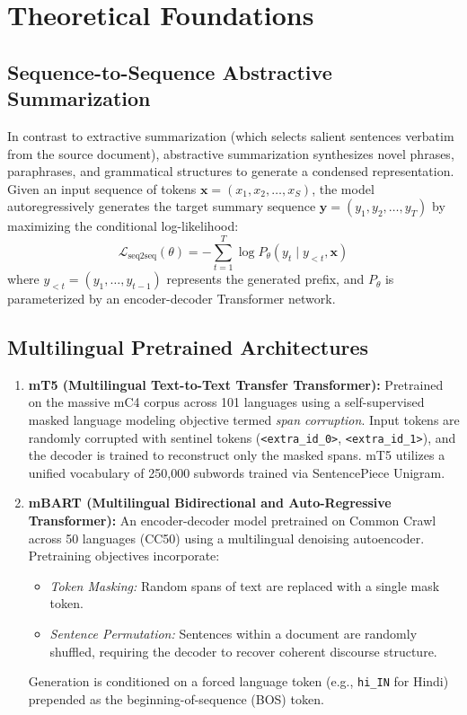 \section{Theoretical Foundations}
\subsection{Sequence-to-Sequence Abstractive Summarization}
In contrast to extractive summarization (which selects salient sentences verbatim from the source document), abstractive summarization synthesizes novel phrases, paraphrases, and grammatical structures to generate a condensed representation. Given an input sequence of tokens $\mathbf{x} = (x_1, x_2, \dots, x_S)$, the model autoregressively generates the target summary sequence $\mathbf{y} = (y_1, y_2, \dots, y_T)$ by maximizing the conditional log-likelihood:
\begin{equation}
    \mathcal{L}_{\text{seq2seq}}(\theta) = -\sum_{t=1}^{T} \log P_\theta(y_t \mid y_{<t}, \mathbf{x})
\end{equation}
where $y_{<t} = (y_1, \dots, y_{t-1})$ represents the generated prefix, and $P_\theta$ is parameterized by an encoder-decoder Transformer network.

\subsection{Multilingual Pretrained Architectures}
\begin{enumerate}
    \item \textbf{mT5 (Multilingual Text-to-Text Transfer Transformer):} Pretrained on the massive mC4 corpus across 101 languages using a self-supervised masked language modeling objective termed \textit{span corruption}. Input tokens are randomly corrupted with sentinel tokens (\lstinline|<extra_id_0>|, \lstinline|<extra_id_1>|), and the decoder is trained to reconstruct only the masked spans. mT5 utilizes a unified vocabulary of 250,000 subwords trained via SentencePiece Unigram.
    \item \textbf{mBART (Multilingual Bidirectional and Auto-Regressive Transformer):} An encoder-decoder model pretrained on Common Crawl across 50 languages (CC50) using a multilingual denoising autoencoder. Pretraining objectives incorporate:
    \begin{itemize}
        \item \textit{Token Masking:} Random spans of text are replaced with a single mask token.
        \item \textit{Sentence Permutation:} Sentences within a document are randomly shuffled, requiring the decoder to recover coherent discourse structure.
    \end{itemize}
    Generation is conditioned on a forced language token (e.g., \texttt{hi\_IN} for Hindi) prepended as the beginning-of-sequence (BOS) token.
\end{enumerate}

